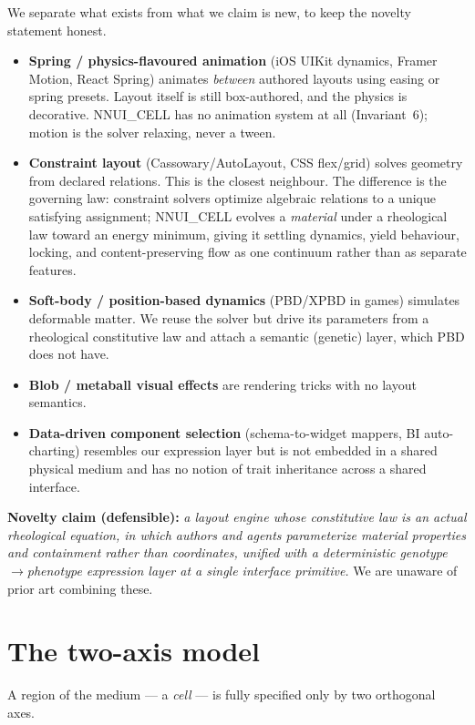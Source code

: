 \documentclass[11pt]{article}
\begin{document}
We separate what exists from what we claim is new, to keep the novelty statement honest.

\begin{itemize}[leftmargin=1.4em]
  \item \textbf{Spring / physics-flavoured animation} (iOS UIKit dynamics, Framer Motion, React
  Spring) animates \emph{between} authored layouts using easing or spring presets. Layout itself
  is still box-authored, and the physics is decorative. NNUI\_CELL has no animation system at all
  (Invariant~6); motion is the solver relaxing, never a tween.
  \item \textbf{Constraint layout} (Cassowary/AutoLayout, CSS flex/grid) solves geometry from
  declared relations. This is the closest neighbour. The difference is the governing law:
  constraint solvers optimize algebraic relations to a unique satisfying assignment; NNUI\_CELL
  evolves a \emph{material} under a rheological law toward an energy minimum, giving it settling
  dynamics, yield behaviour, locking, and content-preserving flow as one continuum rather than
  as separate features.
  \item \textbf{Soft-body / position-based dynamics} (PBD/XPBD in games) simulates deformable
  matter. We reuse the solver but drive its parameters from a rheological constitutive law and
  attach a semantic (genetic) layer, which PBD does not have.
  \item \textbf{Blob / metaball visual effects} are rendering tricks with no layout semantics.
  \item \textbf{Data-driven component selection} (schema-to-widget mappers, BI auto-charting)
  resembles our expression layer but is not embedded in a shared physical medium and has no
  notion of trait inheritance across a shared interface.
\end{itemize}

\noindent\textbf{Novelty claim (defensible):} \emph{a layout engine whose constitutive law is an
actual rheological equation, in which authors and agents parameterize material properties and
containment rather than coordinates, unified with a deterministic genotype$\rightarrow$phenotype
expression layer at a single interface primitive.} We are unaware of prior art combining these.

\section{The two-axis model}

A region of the medium --- a \emph{cell} --- is fully specified only by two orthogonal axes.
\end{document}
